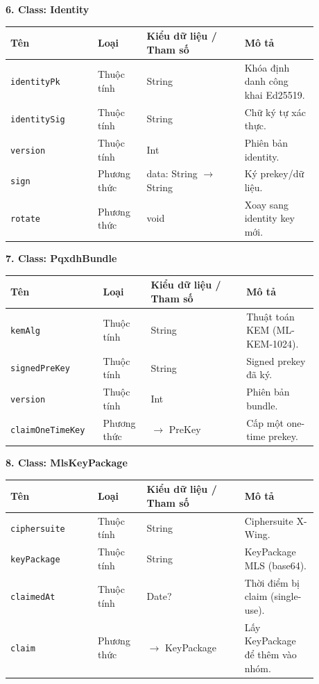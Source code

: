 \textbf{6. Class: Identity}

{\small
\begin{longtable}{|p{0.25\linewidth}|p{0.14\linewidth}|p{0.28\linewidth}|p{0.21\linewidth}|}
\hline
\textbf{Tên} & \textbf{Loại} & \textbf{Kiểu dữ liệu / Tham số} & \textbf{Mô tả} \\ \hline
\endhead
\texttt{identityPk} & Thuộc tính & String & Khóa định danh công khai Ed25519. \\ \hline
\texttt{identitySig} & Thuộc tính & String & Chữ ký tự xác thực. \\ \hline
\texttt{version} & Thuộc tính & Int & Phiên bản identity. \\ \hline
\texttt{sign} & Phương thức & data: String $\rightarrow$ String & Ký prekey/dữ liệu. \\ \hline
\texttt{rotate} & Phương thức & void & Xoay sang identity key mới. \\ \hline
\end{longtable}
}

\textbf{7. Class: PqxdhBundle}

{\small
\begin{longtable}{|p{0.25\linewidth}|p{0.14\linewidth}|p{0.28\linewidth}|p{0.21\linewidth}|}
\hline
\textbf{Tên} & \textbf{Loại} & \textbf{Kiểu dữ liệu / Tham số} & \textbf{Mô tả} \\ \hline
\endhead
\texttt{kemAlg} & Thuộc tính & String & Thuật toán KEM (ML-KEM-1024). \\ \hline
\texttt{signedPreKey} & Thuộc tính & String & Signed prekey đã ký. \\ \hline
\texttt{version} & Thuộc tính & Int & Phiên bản bundle. \\ \hline
\texttt{claimOneTimeKey} & Phương thức & $\rightarrow$ PreKey & Cấp một one-time prekey. \\ \hline
\end{longtable}
}

\textbf{8. Class: MlsKeyPackage}

{\small
\begin{longtable}{|p{0.25\linewidth}|p{0.14\linewidth}|p{0.28\linewidth}|p{0.21\linewidth}|}
\hline
\textbf{Tên} & \textbf{Loại} & \textbf{Kiểu dữ liệu / Tham số} & \textbf{Mô tả} \\ \hline
\endhead
\texttt{ciphersuite} & Thuộc tính & String & Ciphersuite X-Wing. \\ \hline
\texttt{keyPackage} & Thuộc tính & String & KeyPackage MLS (base64). \\ \hline
\texttt{claimedAt} & Thuộc tính & Date? & Thời điểm bị claim (single-use). \\ \hline
\texttt{claim} & Phương thức & $\rightarrow$ KeyPackage & Lấy KeyPackage để thêm vào nhóm. \\ \hline
\end{longtable}
}

